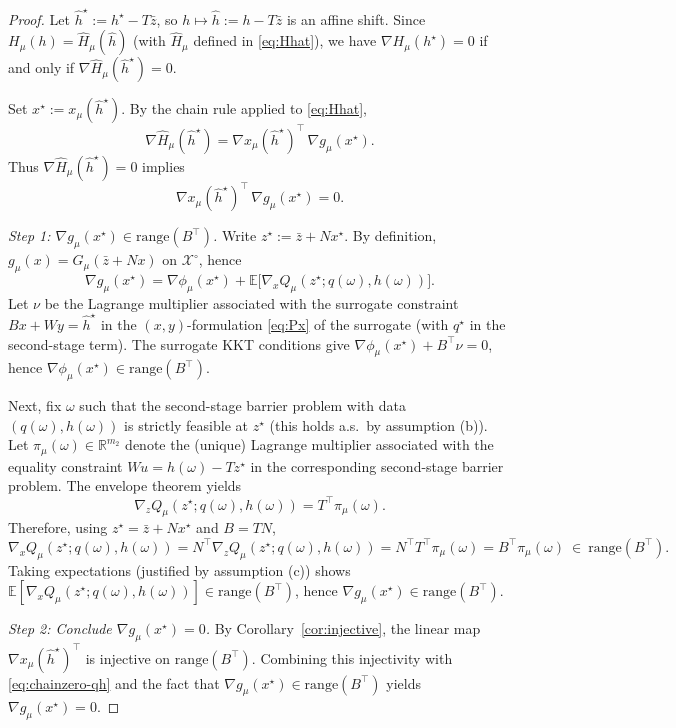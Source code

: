 \documentclass[11pt]{article}
\newcommand{\R}{\mathbb{R}}
\newcommand{\E}{\mathbb{E}}
\theoremstyle{plain}
\theoremstyle{definition}
\begin{document}
\begin{proof}
Let $\hat h^\star := h^\star - T\bar z$, so $h\mapsto \hat h:=h-T\bar z$ is an affine shift. Since
$H_\mu(h)=\widehat H_\mu(\hat h)$ (with $\widehat H_\mu$ defined in \eqref{eq:Hhat}), we have
$\nabla H_\mu(h^\star)=0$ if and only if $\nabla \widehat H_\mu(\hat h^\star)=0$.

Set $x^\star := x_\mu(\hat h^\star)$. By the chain rule applied to \eqref{eq:Hhat},
\[
\nabla \widehat H_\mu(\hat h^\star)
= \nabla x_\mu(\hat h^\star)^\top\,\nabla g_\mu(x^\star).
\]
Thus $\nabla \widehat H_\mu(\hat h^\star)=0$ implies
\begin{equation}\label{eq:chainzero-qh}
\nabla x_\mu(\hat h^\star)^\top\,\nabla g_\mu(x^\star)=0.
\end{equation}

\smallskip
\noindent\emph{Step 1: $\nabla g_\mu(x^\star)\in\mathrm{range}(B^\top)$.}
Write $z^\star:=\bar z+N x^\star$. By definition, $g_\mu(x)=G_\mu(\bar z+Nx)$ on $\mathcal{X}^\circ$, hence
\[
\nabla g_\mu(x^\star)=\nabla \phi_\mu(x^\star)
+\E\bigl[\nabla_x Q_\mu(z^\star;q(\omega),h(\omega))\bigr].
\]
Let $\nu$ be the Lagrange multiplier associated with the surrogate constraint $Bx+Wy=\hat h^\star$
in the $(x,y)$-formulation \eqref{eq:Px} of the surrogate (with $q^\star$ in the second-stage term).
The surrogate KKT conditions give
$\nabla\phi_\mu(x^\star)+B^\top\nu=0$, hence $\nabla\phi_\mu(x^\star)\in\mathrm{range}(B^\top)$.

Next, fix $\omega$ such that the second-stage barrier problem with data $(q(\omega),h(\omega))$ is
strictly feasible at $z^\star$ (this holds a.s.\ by assumption (b)). Let $\pi_\mu(\omega)\in\R^{m_2}$
denote the (unique) Lagrange multiplier associated with the equality constraint
$W u = h(\omega)-T z^\star$ in the corresponding second-stage barrier problem. The envelope theorem yields
\[
\nabla_z Q_\mu(z^\star;q(\omega),h(\omega)) = T^\top \pi_\mu(\omega).
\]
Therefore, using $z^\star=\bar z+N x^\star$ and $B=TN$,
\[
\nabla_x Q_\mu(z^\star;q(\omega),h(\omega))
= N^\top \nabla_z Q_\mu(z^\star;q(\omega),h(\omega))
= N^\top T^\top \pi_\mu(\omega)
= B^\top \pi_\mu(\omega)\ \in\ \mathrm{range}(B^\top).
\]
Taking expectations (justified by assumption (c)) shows
$\E[\nabla_x Q_\mu(z^\star;q(\omega),h(\omega))]\in\mathrm{range}(B^\top)$, hence
$\nabla g_\mu(x^\star)\in\mathrm{range}(B^\top)$.

\smallskip
\noindent\emph{Step 2: Conclude $\nabla g_\mu(x^\star)=0$.}
By Corollary~\ref{cor:injective}, the linear map $\nabla x_\mu(\hat h^\star)^\top$ is injective on $\mathrm{range}(B^\top)$.
Combining this injectivity with \eqref{eq:chainzero-qh} and the fact that
$\nabla g_\mu(x^\star)\in\mathrm{range}(B^\top)$ yields $\nabla g_\mu(x^\star)=0$.


\end{proof}
\end{document}
